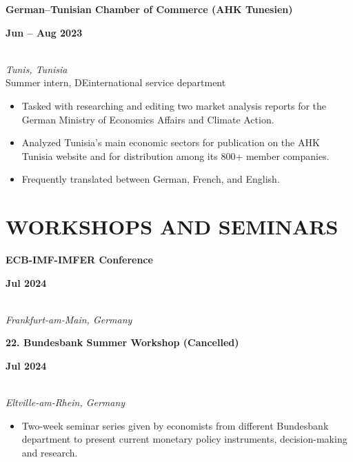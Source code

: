 \documentclass[a4paper,9pt]{extarticle}
\begin{document}
\noindent
\begin{minipage}[t]{0.7\textwidth}
  \textbf{German--Tunisian Chamber of Commerce (AHK Tunesien)}
\end{minipage}
\begin{minipage}[t]{0.3\textwidth}
  \raggedleft \textbf{Jun -- Aug 2023}
\end{minipage}
\\
\textit{Tunis, Tunisia} \\ 
Summer intern, DEinternational service department 
\begin{itemize}[noitemsep, topsep=0pt, left=0.65cm]
    \item Tasked with researching and editing two market analysis reports for the German Ministry of Economics Affairs and Climate Action.
    \item Analyzed Tunisia's main economic sectors for publication on the AHK Tunisia website and for distribution among its 800+ member companies. 
    \item Frequently translated between German, French, and English. \\
\end{itemize} 


\section*{WORKSHOPS AND SEMINARS}

\begin{minipage}[t]{0.7\textwidth}
  \textbf{ECB-IMF-IMFER Conference}
\end{minipage}
\begin{minipage}[t]{0.3\textwidth}
  \raggedleft \textbf{Jul 2024}
\end{minipage}
\\
\textit{Frankfurt-am-Main, Germany} 

\begin{minipage}[t]{0.7\textwidth}
  \textbf{22. Bundesbank Summer Workshop (Cancelled)}
\end{minipage}
\begin{minipage}[t]{0.3\textwidth}
  \raggedleft \textbf{Jul 2024}
\end{minipage}
\\
\textit{Eltville-am-Rhein, Germany} 
\begin{itemize}[noitemsep, topsep=0pt, left=0.65cm]
    \item Two-week seminar series given by economists from different Bundesbank department to present current monetary policy instruments, decision-making and research. \\
\end{itemize} 
\end{document}

